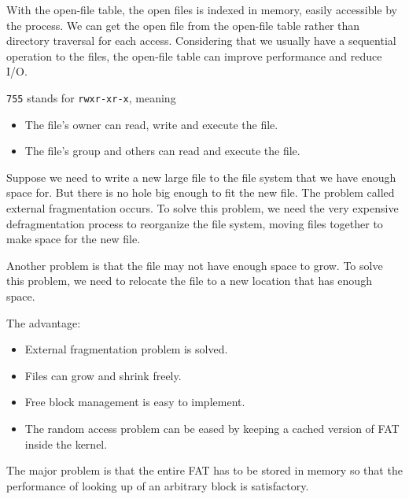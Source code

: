 \documentclass[11pt]{homework}
\begin{document}
With the open-file table, the open files is indexed in memory, easily accessible by the process.
We can get the open file from the open-file table rather than directory traversal for each access.
Considering that we usually have a sequential operation to the files, the open-file table can
improve performance and reduce I/O.

\question
\texttt{755} stands for \texttt{rwxr-xr-x}, meaning
\begin{itemize}
    \item The file's owner can read, write and execute the file.
    \item The file's group and others can read and execute the file.
\end{itemize}

\question
Suppose we need to write a new large file to the file system that we have enough space for. But
there is no hole big enough to fit the new file. The problem called external fragmentation occurs.
To solve this problem, we need the very expensive defragmentation process to reorganize the file system, moving
files together to make space for the new file.

Another problem is that the file may not have enough space to grow. To solve this problem, we need
to relocate the file to a new location that has enough space.

\question
The advantage:
\begin{itemize}
    \item External fragmentation problem is solved.
    \item Files can grow and shrink freely.
    \item Free block management is easy to implement.
    \item The random access problem can be eased by keeping a cached version of FAT inside the kernel.
\end{itemize}

The major problem is that the entire FAT has to be stored in memory so that the performance of
looking up of an arbitrary block is satisfactory.
\end{document}
